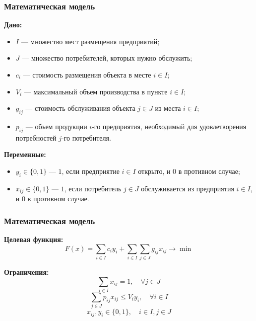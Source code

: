 \documentclass[12pt]{beamer}
\begin{document}
    \begin{frame}
        \frametitle{Математическая модель}
    
        \textbf{Дано:}
        \begin{itemize}
            \item $I$      --- множество мест размещения предприятий;
            \item $J$      --- множество потребителей, которых нужно обслужить;
            \item $c_i$    --- стоимость размещения объекта в месте $i \in I$;
            \item $V_{i}$  --- максимальный объем производства в пункте $i \in I$;
            \item $g_{ij}$ --- стоимость обслуживания объекта $j \in J$ из места $i \in I$;
            \item $p_{ij}$ --- объем продукции $i$-го предприятия, необходимый для удовлетворения потребностей $j$-го потребителя.
        \end{itemize}

        \textbf{Переменные:}
        \begin{itemize}
            \item $y_i \in \{0, 1\}$    --- $1$, если предприятие $i \in I$ открыто, и $0$ в противном случае;
            \item $x_{ij} \in \{0, 1\}$ --- $1$, если потребитель $j \in J$ обслуживается из предприятия $i \in I$, и $0$ в противном случае.
        \end{itemize}
    
    \end{frame}

    \begin{frame}
        \frametitle{Математическая модель}
    
        \textbf{Целевая функция:}
        \begin{equation}
            F(x) = \sum_{i \in I} c_i y_i + \sum_{i \in I} \sum_{j \in J} g_{ij} x_{ij} \to \min
        \end{equation}

        \textbf{Ограничения:}
        \begin{equation}
            \sum_{i \in I} x_{ij} = 1, \quad \forall j \in J
        \end{equation}
        \begin{equation}
            \sum_{j \in J} p_{ij} x_{ij} \leq V_{i} y_{i}, \quad \forall i \in I
        \end{equation}
        \begin{equation}
            x_{ij}, y_i \in \{0, 1\}, \quad i \in I, j \in J
        \end{equation}
    
    \end{frame}
\end{document}
